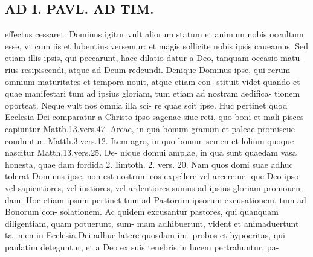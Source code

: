 \documentclass{article}
\begin{document}
\begin{pages}
\section*{AD I. PAVL. AD TIM. }
\marginpar{[ p.380 ]}\pstart effectus cessaret. Dominus igitur vult aliorum statum et animum nobis occultum esse, vt cum iis et lubentius versemur: et magis sollicite nobis ipsis caueamus. Sed etiam illis ipsis, qui peccarunt, haec dilatio datur a Deo, tanquam occasio matu- rius resipiscendi, atque ad Deum redeundi.  \pend\pstart Denique Dominus ipse, qui rerum omnium maturitates et tempora nouit, atque etiam con- stituit videt quando et quae manifestari tum ad ipsius gloriam, tum etiam ad nostram aedifica- tionem oporteat. Neque vult nos omnia illa sci- re quae scit ipse.  \pend\pstart Huc pertinet quod Ecclesia Dei comparatur a Christo ipso sagenae siue reti, quo boni et mali pisces capiuntur Matth.13.vers.47. Areae, in qua bonum granum et paleae promiscue conduntur. Matth.3.vers.12. Item agro, in quo bonum semen et lolium quoque nascitur Matth.13.vers.25. De- nique domui amplae, in qua sunt quaedam vasa honesta, quae dam fordida 2. Iimtoth. 2. vers. 20. Nam quos domi suae adhuc tolerat Dominus ipse, non est nostrum eos expellere vel arcere:ne- que Deo ipso vel sapientiores, vel iustiores, vel ardentiores sumus ad ipsius gloriam promouen- dam.  \pend\pstart Hoc etiam ipsum pertinet tum ad Pastorum ipsorum excusationem, tum ad Bonorum con- solationem. Ac quidem excusantur pastores, qui quanquam diligentiam, quam potuerunt, sum- mam adhibuerunt, vident et animaduertunt ta- men in Ecclesia Dei adhuc latere quosdam im- probos et hypocritas, qui paulatim deteguntur, et a Deo ex suis tenebris in lucem pertrahuntur, pa-  \pend

\end{pages}
\end{document}
